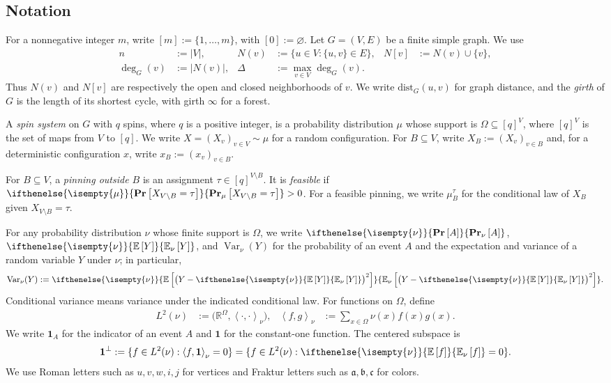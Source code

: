 \documentclass[a4paper,12pt]{article}
\theoremstyle{plain}
\theoremstyle{definition}
\def\*#1{\mathbf{#1}} %
\def\*#1{\boldsymbol{#1}} %
\def\oPr{\mathbf{Pr}}
\renewcommand{\Pr}[2][]{ \ifthenelse{\isempty{#1}}
  {\oPr\left[#2\right]}
  {\oPr_{#1}\left[#2\right]} } %
\def\oE{\mathbb{E}}
\newcommand{\E}[2][]{ \ifthenelse{\isempty{#1}}
  {\oE\left[#2\right]}
  {\oE_{#1}\left[#2\right]} }
\newcommand{\dist}{\mathrm{dist}}
\newcommand{\inner}[2]{\left\langle #1,#2\right\rangle}
\begin{document}
\subsection{Notation}
\label{subsec:notation}
For a nonnegative integer $m$, write $[m]:=\{1,\ldots,m\}$, with
$[0]:=\varnothing$.  Let
$G=(V,E)$ be a finite simple graph.  We use
\begin{align*}
  n&:=|V|,
  &N(v)&:=\{u\in V:\{u,v\}\in E\},
  &N[v]&:=N(v)\cup\{v\},\\
  \deg_G(v)&:=|N(v)|,
  &\Delta&:=\max_{v\in V}\deg_G(v).
\end{align*}
Thus $N(v)$ and $N[v]$ are respectively the open and closed neighborhoods
of $v$.  We write $\dist_G(u,v)$ for graph distance, and the \emph{girth}
of $G$ is the length of its shortest cycle, with girth $\infty$ for a
forest.

A \emph{spin system} on $G$ with $q$ spins, where $q$ is a positive integer, is a
probability distribution $\mu$ whose support is
$\Omega\subseteq[q]^V$, where $[q]^V$ is the set of maps from $V$ to
$[q]$.  We write
$X=(X_v)_{v\in V}\sim\mu$ for a random configuration.  For
$B\subseteq V$, write $X_B:=(X_v)_{v\in B}$ and, for a deterministic
configuration $x$, write $x_B:=(x_v)_{v\in B}$.

For $B\subseteq V$, a \emph{pinning outside $B$} is an assignment
$\tau\in[q]^{V\setminus B}$.  It is \emph{feasible} if
$\Pr[\mu]{X_{V\setminus B}=\tau}>0$.  For a feasible pinning, we write
$\mu_B^\tau$ for the conditional law of $X_B$ given
$X_{V\setminus B}=\tau$.

For any probability distribution $\nu$ whose finite support is $\Omega$, we
write $\Pr[\nu]{A}$, $\E[\nu]{Y}$, and
$\operatorname{Var}_\nu(Y)$ for the probability of an event $A$ and the
expectation and variance of a random variable $Y$ under $\nu$; in
particular,
\begin{align*}
  \operatorname{Var}_\nu(Y)
  :=\E[\nu]{\bigl(Y-\E[\nu]{Y}\bigr)^2}.
\end{align*}
Conditional variance means variance under the indicated conditional law.
For functions on $\Omega$, define
\begin{align*}
  L^2(\nu)&:=\bigl(\mathbb R^\Omega,\inner{\cdot}{\cdot}_\nu\bigr),
  &\inner{f}{g}_\nu&:=\sum_{x\in\Omega}\nu(x)f(x)g(x).
\end{align*}
We write $\*1_A$ for the indicator of an event $A$ and $\*1$ for the
constant-one function.  The centered subspace is
\begin{align*}
  \*1^\perp
  :=\{f\in L^2(\nu):\inner{f}{\*1}_\nu=0\}
  =\{f\in L^2(\nu):\E[\nu]{f}=0\}.
\end{align*}
We use Roman letters such as $u,v,w,i,j$ for vertices and Fraktur letters
such as $\mathfrak a,\mathfrak b,\mathfrak c$ for colors.
\end{document}
